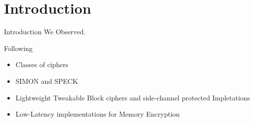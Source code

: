 \section{Introduction}


\begin{frame}{Introduction}
	We Observed.
	\begin{block}{Following}
		\begin{itemize}[<+->]
\item	Classes of ciphers
\item SIMON and SPECK
\item Lightweight Tweakable Block ciphers and side-channel protected Impletations
\item Low-Latency implementations for Memory Encryption
		\end{itemize}
	\end{block}
\end{frame}